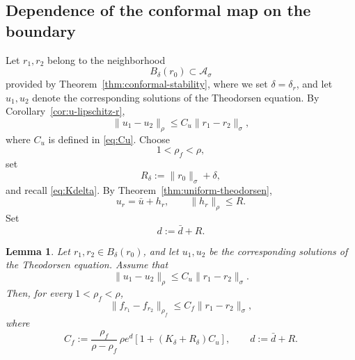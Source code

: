 \documentclass[11pt,a4paper]{amsart}
\newtheorem{lemma}[theorem]{Lemma}
\begin{document}
\subsection{Dependence of the conformal map on the boundary}

Let $r_1,r_2$ belong to the neighborhood
\[
B_{\delta}(r_0)\subset\mathcal A_\sigma
\]
provided by Theorem~\ref{thm:conformal-stability}, where we set $\delta=\delta_r$, and let
$u_1,u_2$ denote the corresponding solutions of the Theodorsen
equation. By Corollary~\ref{cor:u-lipschitz-r},
\begin{equation}\label{eq:u-r-lipschitz-elliptic}
	\|u_1-u_2\|_\rho
	\le
	C_u\|r_1-r_2\|_\sigma,
\end{equation}
where $C_u$ is defined in \eqref{eq:Cu}.
Choose
\[
1<\rho_f<\rho,
\]
set
\[
R_\delta:=\|r_0\|_\sigma+\delta,
\]
and recall \eqref{eq:Kdelta}.
By Theorem~\ref{thm:uniform-theodorsen},
\[
u_r=\bar u+h_r,
\qquad
\|h_r\|_\rho\le R.
\]
Set
\[
d:=\bar d+R.
\]
\begin{lemma}\label{lem:Cf}
	Let $r_1,r_2\in B_\delta(r_0)$, and let $u_1,u_2$ be the
	corresponding solutions of the Theodorsen equation. Assume that
	\[
	\|u_1-u_2\|_\rho
	\le
	C_u\|r_1-r_2\|_\sigma .
	\]
	Then, for every $1<\rho_f<\rho$,
	\begin{equation}\label{eq:f-lipschitz}
		\|f_{r_1}-f_{r_2}\|_{\rho_f}
		\le
		C_f\|r_1-r_2\|_\sigma ,
	\end{equation}
	where
	\begin{equation}\label{eq:Cf}
		C_f
		:=
		\frac{\rho_f}{\rho-\rho_f}\,
		\rho e^d
		\left[
		1+(K_\delta+R_\delta)C_u
		\right],
		\qquad
		d:=\bar d+R .
	\end{equation}
\end{lemma}
\end{document}
